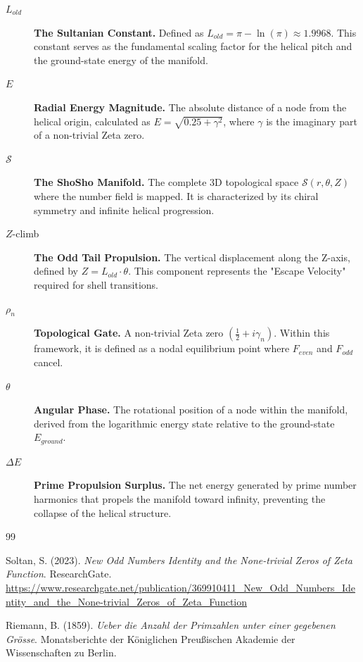 \documentclass[11pt,a4paper]{article}
\begin{document}
\begin{description}
    \item[$L_{old}$] \textbf{The Sultanian Constant.} Defined as $L_{old} = \pi - \ln(\pi) \approx 1.9968$. This constant serves as the fundamental scaling factor for the helical pitch and the ground-state energy of the manifold.
    
    \item[$E$] \textbf{Radial Energy Magnitude.} The absolute distance of a node from the helical origin, calculated as $E = \sqrt{0.25 + \gamma^2}$, where $\gamma$ is the imaginary part of a non-trivial Zeta zero.
    
    \item[$\mathcal{S}$] \textbf{The ShoSho Manifold.} The complete 3D topological space $\mathcal{S}(r, \theta, Z)$ where the number field is mapped. It is characterized by its chiral symmetry and infinite helical progression.
    
    \item[$Z$-climb] \textbf{The Odd Tail Propulsion.} The vertical displacement along the Z-axis, defined by $Z = L_{old} \cdot \theta$. This component represents the "Escape Velocity" required for shell transitions.
    
    \item[$\rho_n$] \textbf{Topological Gate.} A non-trivial Zeta zero $(\frac{1}{2} + i\gamma_n)$. Within this framework, it is defined as a nodal equilibrium point where $F_{even}$ and $F_{odd}$ cancel.
    
    \item[$\theta$] \textbf{Angular Phase.} The rotational position of a node within the manifold, derived from the logarithmic energy state relative to the ground-state $E_{ground}$.
    
    \item[$\Delta E$] \textbf{Prime Propulsion Surplus.} The net energy generated by prime number harmonics that propels the manifold toward infinity, preventing the collapse of the helical structure.
\end{description}

\begin{thebibliography}{99}

Soltan, S. (2023). 
\textit{New Odd Numbers Identity and the None-trivial Zeros of Zeta Function}. 
ResearchGate. \url{https://www.researchgate.net/publication/369910411_New_Odd_Numbers_Identity_and_the_None-trivial_Zeros_of_Zeta_Function}

Riemann, B. (1859). 
\textit{Ueber die Anzahl der Primzahlen unter einer gegebenen Grösse}. 
Monatsberichte der Königlichen Preußischen Akademie der Wissenschaften zu Berlin.


\end{thebibliography}
\end{document}
